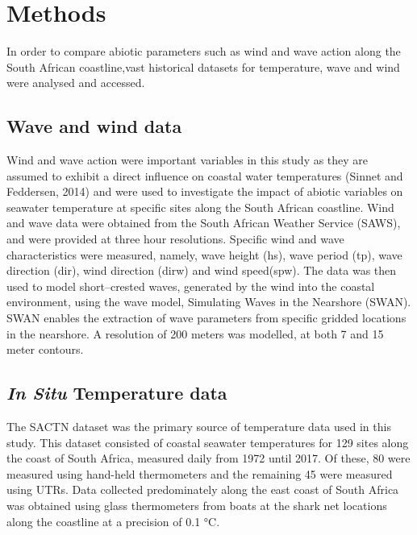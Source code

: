 \documentclass[12pt,A4paper,]{article}
\begin{document}
\newpage

\section{Methods}\label{methods}

In order to compare abiotic parameters such as wind and wave action
along the South African coastline,vast historical datasets for
temperature, wave and wind were analysed and accessed.

\subsection{Wave and wind data}\label{wave-and-wind-data}

Wind and wave action were important variables in this study as they are
assumed to exhibit a direct influence on coastal water temperatures
(Sinnet and Feddersen, 2014) and were used to investigate the impact of
abiotic variables on seawater temperature at specific sites along the
South African coastline. Wind and wave data were obtained from the South
African Weather Service (SAWS), and were provided at three hour
resolutions. Specific wind and wave characteristics were measured,
namely, wave height (hs), wave period (tp), wave direction (dir), wind
direction (dirw) and wind speed(spw). The data was then used to model
short--crested waves, generated by the wind into the coastal
environment, using the wave model, Simulating Waves in the Nearshore
(SWAN). SWAN enables the extraction of wave parameters from specific
gridded locations in the nearshore. A resolution of 200 meters was
modelled, at both 7 and 15 meter contours.

\subsection{\texorpdfstring{\emph{In Situ} Temperature
data}{In Situ Temperature data}}\label{in-situ-temperature-data}

The SACTN dataset was the primary source of temperature data used in
this study. This dataset consisted of coastal seawater temperatures for
129 sites along the coast of South Africa, measured daily from 1972
until 2017. Of these, 80 were measured using hand-held thermometers and
the remaining 45 were measured using UTRs. Data collected predominately
along the east coast of South Africa was obtained using glass
thermometers from boats at the shark net locations along the coastline
at a precision of 0.1 °C.
\end{document}
